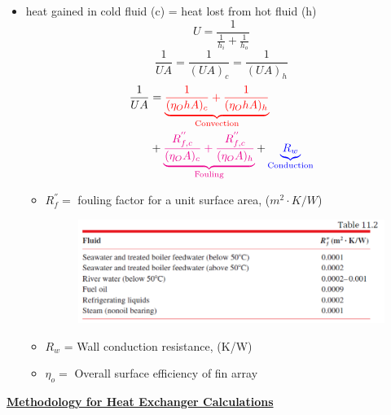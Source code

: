 \begin{itemize}
    \item heat gained in cold fluid (c) = heat lost from hot fluid (h)
    \begin{equation*}
        U = \frac{1}{\frac{1}{h_i}+\frac{1}{h_o}}
    \end{equation*}
    \begin{equation*}
        \frac{1}{UA} = \frac{1}{(UA)_c} = \frac{1}{(UA)_h}
    \end{equation*}
    \begin{align*}
        \frac{1}{UA} &= \color{red}\underbrace{\frac{1}{(\eta_O h A)_c} +\frac{1}{(\eta_O h A)_h}}_{\text{Convection}}\color{black} \\
        &+ \color{magenta}\underbrace{\frac{R_{f,c}^{''}}{(\eta_O A)_c} +\frac{R_{f,c}^{''}}{(\eta_O A)_h}}_{\text{Fouling}}\color{black} + \color{blue}\underbrace{R_w }_{\text{Conduction}} \color{black}
    \end{align*}
    \begin{itemize}
        \item $R_{f}^{''}=$ fouling factor for a unit surface area, ($m^2\cdot K/W$)
        \begin{figure}[H]
            \centering
            \includegraphics[width=1.0\linewidth]{images/Fouling_table.png}
        \end{figure}
        \item \color{blue} $R_w$ \color{black} = Wall conduction resistance, (K/W) 
        \item $\eta_o = $ Overall surface efficiency of fin array
    \end{itemize}
\end{itemize}
\underline{ \textbf{Methodology for Heat Exchanger Calculations}}
